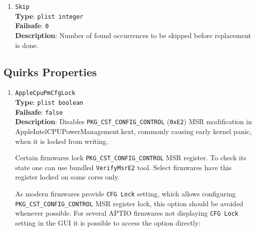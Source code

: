 \documentclass[]{article}
\makeatletter
\renewcommand{\label}[1]{%
\zref@wrapper@immediate{\oldlabel{#1}}}  %
\makeatother
\begin{document}
\begin{enumerate}
\item
  \texttt{Skip}\\
  \textbf{Type}: \texttt{plist\ integer}\\
  \textbf{Failsafe}: \texttt{0}\\
  \textbf{Description}: Number of found occurrences to be skipped before replacement
  is done.

\end{enumerate}

\subsection{Quirks Properties}\label{kernelpropsquirks}

\begin{enumerate}

\item
  \texttt{AppleCpuPmCfgLock}\\
  \textbf{Type}: \texttt{plist\ boolean}\\
  \textbf{Failsafe}: \texttt{false}\\
  \textbf{Description}: Disables \texttt{PKG\_CST\_CONFIG\_CONTROL} (\texttt{0xE2})
  MSR modification in AppleIntelCPUPowerManagement.kext, commonly causing early
  kernel panic, when it is locked from writing.

  Certain firmwares lock \texttt{PKG\_CST\_CONFIG\_CONTROL} MSR register. To check its
  state one can use bundled \texttt{VerifyMsrE2} tool. Select firmwares have this
  register locked on some cores only.

  As modern firmwares provide \texttt{CFG Lock} setting, which allows configuring
  \texttt{PKG\_CST\_CONFIG\_CONTROL} MSR register lock, this option should be avoided
  whenever possible. For several APTIO firmwares not displaying \texttt{CFG Lock} setting
  in the GUI it is possible to access the option directly:


\end{enumerate}
\end{document}

